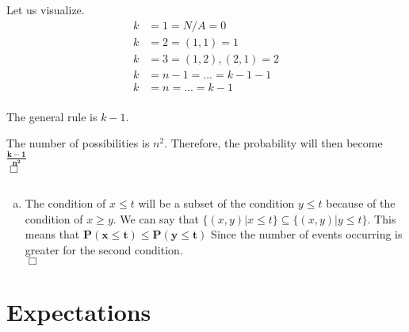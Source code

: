 \documentclass[10pt]{report}
\newenvironment{proof}{\par\noindent{\it Proof.}\hspace*{1em}}{$\Box$\bigskip}
\begin{document}
\begin{enumerate}[(a)]
\begin{proof}
 Let us visualize. 
 \begin{align*}
 k &= 1 = N/A = 0\\
 k&= 2 = (1,1) = 1 \\
 k&= 3 = (1,2), (2,1) = 2 \\
 k&= n-1 = ... = k - 1 -1 \\
 k&= n = ... = k - 1 \\
 \end{align*}
  \begin{center}
 The general rule is $k-1 $.
 \end{center}
 The number of possibilities is $n^2$. Therefore, the probability will then become $\mathbf{\frac{k-1}{n^2}}$ \\
 \end{proof}
 \end{enumerate}
     \setcounter{subsection}{22}
    \subsection{}
 \begin{enumerate}[(a)]
 \item \begin{proof}

The condition of $x \leq t $ will be a subset of the condition $y \leq t $ because of the condition of $ x \geq y $. We can say that $\{(x,y) | x \leq t \} \subseteq \{(x,y) | y\leq t \} $. This means that $\mathbf{P(x\leq t) \leq P(y \leq t)} $ Since the number of events occurring is greater for the second condition.\\
 \end{proof}
 \end{enumerate}
        \setcounter{section}{1}
 \section{\sc\color{cit}Expectations}
      \setcounter{subsection}{2}
\end{document}
